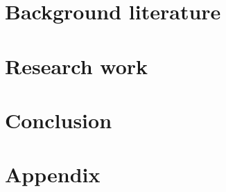 \documentclass{book}
\begin{document}


\chapter{Background literature \label{Chapter:Review}}








\chapter{Research work \label{Chapter:Work}}











\chapter{Conclusion \label{Conclusion}}



\chapter{Appendix}
\label{Appendix}













\end{document}
